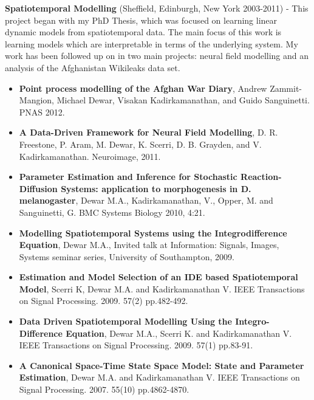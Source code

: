 \documentclass{res}
\begin{document}
\begin{resume}
    \textbf{Spatiotemporal Modelling} (Sheffield, Edinburgh, New York 2003-2011) - This project began with my PhD Thesis, which was focused on learning linear dynamic models from spatiotemporal data. The main focus of this work is learning models which are interpretable in terms of the underlying system. My work has been followed up on in two main projects: neural field modelling and an analysis of the Afghanistan Wikileaks data set.

    \begin{itemize}
        \item {\bf Point process modelling of the Afghan War Diary}, Andrew Zammit-Mangion, Michael Dewar, Visakan Kadirkamanathan, and Guido Sanguinetti. PNAS 2012.
        \item {\bf A Data-Driven Framework for Neural Field Modelling}, D. R. Freestone, P. Aram, M. Dewar, K. Scerri, D. B. Grayden, and V. Kadirkamanathan. Neuroimage, 2011.
        \item {\bf Parameter Estimation and Inference for Stochastic Reaction-Diffusion Systems: application to morphogenesis in D. melanogaster}, Dewar M.A., Kadirkamanathan, V., Opper, M. and Sanguinetti, G. BMC Systems Biology 2010, 4:21.
        \item {\bf Modelling Spatiotemporal Systems using the Integrodifference Equation}, Dewar M.A., Invited talk at Information: Signals, Images, Systems seminar series, University of Southampton, 2009.
        \item {\bf Estimation and Model Selection of an IDE based Spatiotemporal Model}, Scerri K, Dewar M.A. and Kadirkamanathan V. IEEE Transactions on Signal Processing. 2009. 57(2) pp.482-492.
        \item {\bf Data Driven Spatiotemporal Modelling Using the Integro-Difference Equation}, Dewar M.A., Scerri K. and Kadirkamanathan V. IEEE Transactions on Signal Processing. 2009. 57(1) pp.83-91. 
        \item {\bf A Canonical Space-Time State Space Model: State and Parameter Estimation}, Dewar M.A. and Kadirkamanathan V. IEEE Transactions on Signal Processing. 2007. 55(10) pp.4862-4870.
    \end{itemize}


\end{resume}
\end{document}
